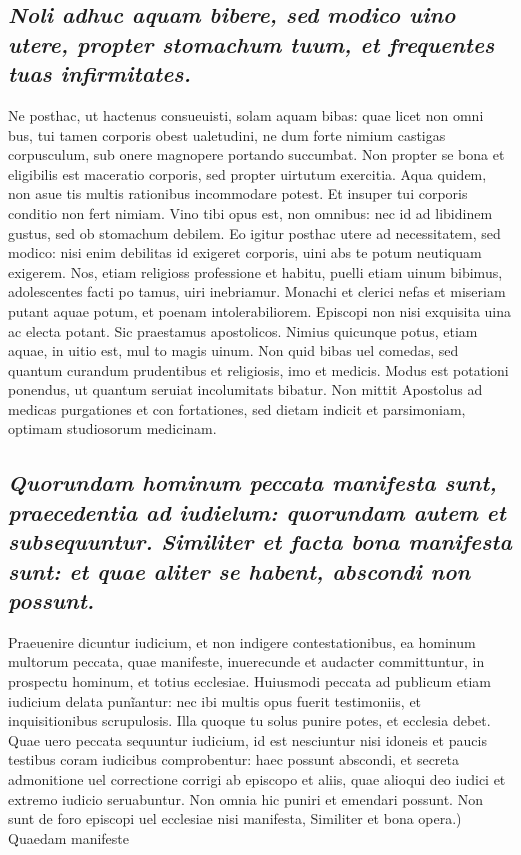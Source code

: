 \documentclass{article}
\begin{document}
\begin{pages}
\subsection*{\textit{Noli adhuc aquam bibere, sed modico uino utere, propter stomachum tuum, et frequentes tuas infirmitates. }}\pstart Ne posthac, ut hactenus consueuisti, solam aquam bibas: quae licet non omni bus, tui tamen corporis obest ualetudini, ne dum forte nimium castigas corpusculum, sub onere magnopere portando succumbat. Non propter se bona et eligibilis est maceratio corporis, sed propter uirtutum exercitia. Aqua quidem, non asue tis multis rationibus incommodare potest. Et insuper tui corporis conditio non fert nimiam. Vino tibi opus est, non omnibus: nec id ad libidinem gustus, sed ob stomachum debilem. Eo igitur posthac utere ad necessitatem, sed modico: nisi enim debilitas id exigeret corporis, uini abs te potum neutiquam exigerem. Nos, etiam religioss professione et habitu, puelli etiam uinum bibimus, adolescentes facti po tamus, uiri inebriamur. Monachi et clerici nefas et miseriam putant aquae potum, et poenam intolerabiliorem. Episcopi non nisi exquisita uina ac electa potant. Sic praestamus apostolicos. Nimius quicunque potus, etiam aquae, in uitio est, mul to magis uinum. Non quid bibas uel comedas, sed quantum curandum prudentibus et religiosis, imo et medicis. Modus est potationi ponendus, ut quantum seruiat incolumitats bibatur. Non mittit Apostolus ad medicas purgationes et con fortationes, sed dietam indicit et parsimoniam, optimam studiosorum medicinam.  \pend
{}
{}
\subsection*{\textit{Quorundam hominum peccata manifesta sunt, praecedentia ad iudielum: quorundam autem et subsequuntur. Similiter et facta bona manifesta sunt: et quae aliter se habent, abscondi non possunt. }}\pstart Praeuenire dicuntur iudicium, et non indigere contestationibus, ea hominum multorum peccata, quae manifeste, inuerecunde et audacter committuntur, in prospectu hominum, et totius ecclesiae. Huiusmodi peccata ad publicum etiam iudicium delata punĩantur: nec ibi multis opus fuerit testimoniis, et inquisitionibus scrupulosis. Illa quoque tu solus punire potes, et ecclesia debet. Quae uero peccata sequuntur iudicium, id est nesciuntur nisi idoneis et paucis testibus coram iudicibus comprobentur: haec possunt abscondi, et secreta admonitione uel correctione corrigi ab episcopo et aliis, quae alioqui deo iudici et extremo iudicio seruabuntur. Non omnia hic puniri et emendari possunt. Non sunt de foro episcopi uel ecclesiae nisi manifesta, Similiter et bona opera.) Quaedam manifeste  \pend

\end{pages}
\end{document}
